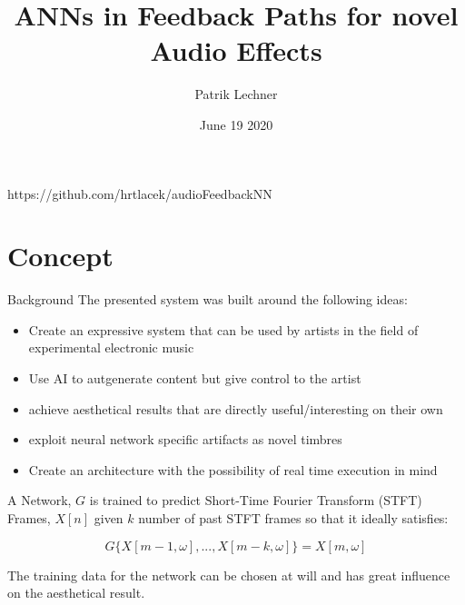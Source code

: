 \documentclass{beamer}
\title{ANNs in Feedback Paths for novel Audio Effects}
\author{Patrik Lechner\texorpdfstring{\\}{,} }
\institute{IC\textbackslash M/T \\ FH Stp.}
\date{June 19 2020}
\begin{document}
    \begin{frame}
		\maketitle
		
		https://github.com/hrtlacek/audioFeedbackNN
    \end{frame}
    
	\section{Concept}
	
    \begin{frame}{Background}
    	The presented system was built around the following ideas:
    	\begin{itemize}
        \item Create an expressive system that can be used by artists in the field of experimental electronic music
        \item Use AI to autgenerate content but give control to the artist
        \item achieve aesthetical results that are directly useful/interesting on their own
		\item exploit neural network specific artifacts as novel timbres
		\item Create an architecture with the possibility of real time execution in mind
        \end{itemize} 
    \end{frame}


	\begin{frame}
		A Network, $G$ is trained to predict Short-Time Fourier Transform (STFT) Frames, $X[n]$ given $k$ number of 
		past STFT frames so that it ideally satisfies:
		
		\begin{equation}
			G\{X[m-1, \omega],..., X[m-k, \omega]\}=X[m, \omega]
		\end{equation}

		The training data for the network can be chosen at will and has great influence on the aesthetical result. 
		

	\end{frame}
\end{document}
